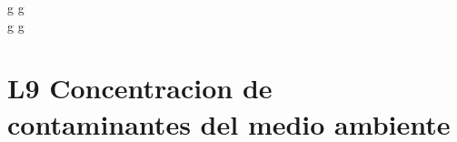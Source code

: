 \documentclass[12pt,addpoints]{evalua}
\begin{document}
\begin{questions}
{\begin{multicols}{2}
\begin{parts}
                    \begin{oneparchoices}
                          g
                          g\\
                          g
                          g
                    \end{oneparchoices}
               \end{parts}
          \end{multicols}
     }


	\section*{L9 Concentracion de contaminantes del medio ambiente}

     






\end{questions}
\end{document}
